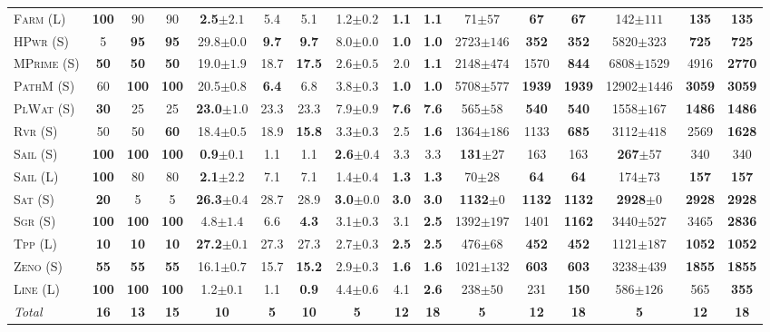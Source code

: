 \documentclass[11pt,landscape]{article}
\begin{document}
\begin{table*}[tb]
{\begin{tabular}{|l||ccc||ccc||ccc||ccc||ccc||}
\textsc{Farm} (L)&\textbf{100}&90&90&\textbf{2.5}$\pm 2.1$&5.4&5.1&1.2$\pm 0.2$&\textbf{1.1}&\textbf{1.1}&71$\pm 57$&\textbf{67}&\textbf{67}&142$\pm 111$&\textbf{135}&\textbf{135}\\
\textsc{HPwr} (S)&5&\textbf{95}&\textbf{95}&29.8$\pm 0.0$&\textbf{9.7}&\textbf{9.7}&8.0$\pm 0.0$&\textbf{1.0}&\textbf{1.0}&2723$\pm 146$&\textbf{352}&\textbf{352}&5820$\pm 323$&\textbf{725}&\textbf{725}\\
\textsc{MPrime} (S)&\textbf{50}&\textbf{50}&\textbf{50}&19.0$\pm 1.9$&18.7&\textbf{17.5}&2.6$\pm 0.5$&2.0&\textbf{1.1}&2148$\pm 474$&1570&\textbf{844}&6808$\pm 1529$&4916&\textbf{2770}\\
\textsc{PathM} (S)&60&\textbf{100}&\textbf{100}&20.5$\pm 0.8$&\textbf{6.4}&6.8&3.8$\pm 0.3$&\textbf{1.0}&\textbf{1.0}&5708$\pm 577$&\textbf{1939}&\textbf{1939}&12902$\pm 1446$&\textbf{3059}&\textbf{3059}\\
\textsc{PlWat} (S)&\textbf{30}&25&25&\textbf{23.0}$\pm 1.0$&23.3&23.3&7.9$\pm 0.9$&\textbf{7.6}&\textbf{7.6}&565$\pm 58$&\textbf{540}&\textbf{540}&1558$\pm 167$&\textbf{1486}&\textbf{1486}\\
\textsc{Rvr} (S)&50&50&\textbf{60}&18.4$\pm 0.5$&18.9&\textbf{15.8}&3.3$\pm 0.3$&2.5&\textbf{1.6}&1364$\pm 186$&1133&\textbf{685}&3112$\pm 418$&2569&\textbf{1628}\\
\textsc{Sail} (S)&\textbf{100}&\textbf{100}&\textbf{100}&\textbf{0.9}$\pm 0.1$&1.1&1.1&\textbf{2.6}$\pm 0.4$&3.3&3.3&\textbf{131}$\pm 27$&163&163&\textbf{267}$\pm 57$&340&340\\
\textsc{Sail} (L)&\textbf{100}&80&80&\textbf{2.1}$\pm 2.2$&7.1&7.1&1.4$\pm 0.4$&\textbf{1.3}&\textbf{1.3}&70$\pm 28$&\textbf{64}&\textbf{64}&174$\pm 73$&\textbf{157}&\textbf{157}\\
\textsc{Sat} (S)&\textbf{20}&5&5&\textbf{26.3}$\pm 0.4$&28.7&28.9&\textbf{3.0}$\pm 0.0$&\textbf{3.0}&\textbf{3.0}&\textbf{1132}$\pm 0$&\textbf{1132}&\textbf{1132}&\textbf{2928}$\pm 0$&\textbf{2928}&\textbf{2928}\\
\textsc{Sgr} (S)&\textbf{100}&\textbf{100}&\textbf{100}&4.8$\pm 1.4$&6.6&\textbf{4.3}&3.1$\pm 0.3$&3.1&\textbf{2.5}&1392$\pm 197$&1401&\textbf{1162}&3440$\pm 527$&3465&\textbf{2836}\\
\textsc{Tpp} (L)&\textbf{10}&\textbf{10}&\textbf{10}&\textbf{27.2}$\pm 0.1$&27.3&27.3&2.7$\pm 0.3$&\textbf{2.5}&\textbf{2.5}&476$\pm 68$&\textbf{452}&\textbf{452}&1121$\pm 187$&\textbf{1052}&\textbf{1052}\\
\textsc{Zeno} (S)&\textbf{55}&\textbf{55}&\textbf{55}&16.1$\pm 0.7$&15.7&\textbf{15.2}&2.9$\pm 0.3$&\textbf{1.6}&\textbf{1.6}&1021$\pm 132$&\textbf{603}&\textbf{603}&3238$\pm 439$&\textbf{1855}&\textbf{1855}\\
\textsc{Line} (L)&\textbf{100}&\textbf{100}&\textbf{100}&1.2$\pm 0.1$&1.1&\textbf{0.9}&4.4$\pm 0.6$&4.1&\textbf{2.6}&238$\pm 50$&231&\textbf{150}&586$\pm 126$&565&\textbf{355}
\\\hline
\textit{Total}&\textbf{16}&\textbf{13}&\textbf{15}&\textbf{10}&\textbf{5}&\textbf{10}&\textbf{5}&\textbf{12}&\textbf{18}&\textbf{5}&\textbf{12}&\textbf{18}&\textbf{5}&\textbf{12}&\textbf{18}\\\hline


\end{tabular}}
\end{table*}
\end{document}
